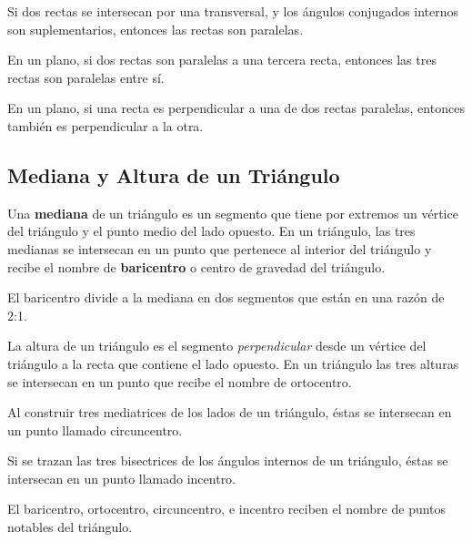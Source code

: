 \begin{theorem}
    Si dos rectas se intersecan por una transversal, y los ángulos conjugados internos son suplementarios, entonces las rectas son paralelas.
\end{theorem}

\begin{theorem}
    En un plano, si dos rectas son paralelas a una tercera recta, entonces las tres rectas son paralelas entre sí.
\end{theorem}

\begin{theorem}
    En un plano, si una recta es perpendicular a una de dos rectas paralelas, entonces también es perpendicular a la otra.
\end{theorem}

\subsection{Mediana y Altura de un Triángulo}

\begin{definition}
    Una \textbf{mediana} de un triángulo es un segmento que tiene por extremos un vértice del triángulo  y el punto medio del lado opuesto. En un triángulo, las tres medianas se intersecan en un punto que pertenece al interior del triángulo y recibe el nombre de \textbf{baricentro} o centro de gravedad del triángulo.
\end{definition}

\begin{theorem}
    El baricentro divide a la mediana en dos segmentos que están en una razón de 2:1.
\end{theorem}

\begin{definition}
    La altura de un triángulo es el segmento \textit{perpendicular} desde un vértice del triángulo a la recta que contiene el lado opuesto. En un triángulo las tres alturas se intersecan en un punto que recibe el nombre de ortocentro.
\end{definition}

\begin{definition}
    Al construir tres mediatrices de los lados de un triángulo, éstas se intersecan en un punto llamado circuncentro.
\end{definition}

\begin{definition}
    Si se trazan las tres bisectrices de los ángulos internos de un triángulo, éstas se intersecan en un punto llamado incentro.
\end{definition}

\begin{definition}
    El baricentro, ortocentro, circuncentro, e incentro reciben el nombre de puntos notables del triángulo.    
\end{definition}

\nocite{MGECED05}
\printbibliography[heading=subbibliography,title={Bibliografía}]